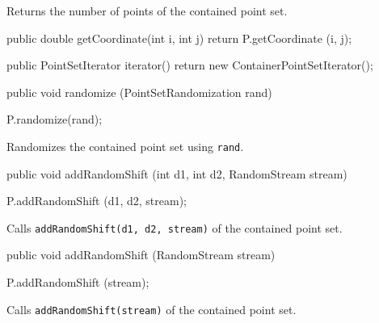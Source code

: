 \begin{tabb}
   Returns the number of points of the contained point set.
\end{tabb}
\begin{htmlonly}
\end{htmlonly}
\begin{code}\begin{hide}

   public double getCoordinate(int i, int j) {
      return P.getCoordinate (i, j);
   }

   public PointSetIterator iterator(){
      return new ContainerPointSetIterator();
   }\end{hide}

   public void randomize (PointSetRandomization rand) \begin{hide} {
       P.randomize(rand);
   }\end{hide}
\end{code}
\begin{tabb}
   Randomizes the contained point set using \texttt{rand}.
\end{tabb}
\begin{htmlonly}
\end{htmlonly}
\begin{code}

   public void addRandomShift (int d1, int d2, RandomStream stream)\begin{hide} {
      P.addRandomShift (d1, d2, stream);
   }\end{hide}
\end{code}
\begin{tabb}
  Calls \texttt{addRandomShift(d1, d2, stream)} of the contained point set.
\end{tabb}
\begin{htmlonly}
\end{htmlonly}
\begin{code}

   public void addRandomShift (RandomStream stream)\begin{hide} {
      P.addRandomShift (stream);
   }\end{hide}
\end{code}
\begin{tabb}
  Calls \texttt{addRandomShift(stream)} of the contained point set.
\end{tabb}
